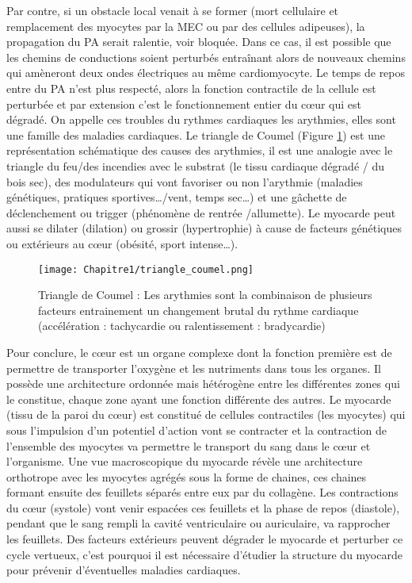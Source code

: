 Par contre, si un obstacle local venait à se former (mort cellulaire et remplacement des myocytes par la MEC ou par des cellules adipeuses), la propagation du PA serait ralentie, voir bloquée. Dans ce cas, il est possible que les chemins de conductions soient perturbés entraînant alors de nouveaux chemins qui amèneront deux ondes électriques au même cardiomyocyte. Le temps de repos entre du PA n’est plus respecté, alors la fonction contractile de la cellule est perturbée et par extension c’est le fonctionnement entier du cœur qui est dégradé. On appelle ces troubles du rythmes cardiaques les arythmies, elles sont une famille des maladies cardiaques. Le triangle de Coumel (Figure \ref{fig:fig_coumel}) est une représentation schématique des causes des arythmies, il est une analogie avec le triangle du feu/des incendies avec le substrat (le tissu cardiaque dégradé / du bois sec), des modulateurs qui vont favoriser ou non l’arythmie (maladies génétiques, pratiques sportives…/vent, temps sec…) et une gâchette de déclenchement ou trigger (phénomène de rentrée /allumette). Le myocarde peut aussi se dilater (dilation) ou grossir (hypertrophie) à cause de facteurs génétiques ou extérieurs au cœur (obésité, sport intense…). 

\begin{figure}[!htbp]
  \begin{center}
    \texttt{[image: Chapitre1/triangle\_coumel.png]}
     \end{center}
    \caption{Triangle de Coumel : Les arythmies sont la combinaison de plusieurs facteurs entrainement un changement brutal du rythme cardiaque (accélération : tachycardie ou ralentissement : bradycardie)}
  \label{fig:fig_coumel}
\end{figure}

Pour conclure, le cœur est un organe complexe dont la fonction première est de permettre de transporter l’oxygène et les nutriments dans tous les organes. Il possède une architecture ordonnée mais hétérogène entre les différentes zones qui le constitue, chaque zone ayant une fonction différente des autres. Le myocarde (tissu de la paroi du cœur) est constitué de cellules contractiles (les myocytes) qui sous l’impulsion d’un potentiel d’action vont se contracter et la contraction de l’ensemble des myocytes va permettre le transport du sang dans le cœur et l’organisme. Une vue macroscopique du myocarde révèle une architecture orthotrope avec les myocytes agrégés sous la forme de chaines, ces chaines formant ensuite des feuillets séparés entre eux par du collagène. Les contractions du cœur (systole) vont venir espacées ces feuillets et la phase de repos (diastole), pendant que le sang rempli la cavité ventriculaire ou auriculaire, va rapprocher les feuillets. Des facteurs extérieurs peuvent dégrader le myocarde et perturber ce cycle vertueux, c’est pourquoi il est nécessaire d’étudier la structure du myocarde pour prévenir d’éventuelles maladies cardiaques.


